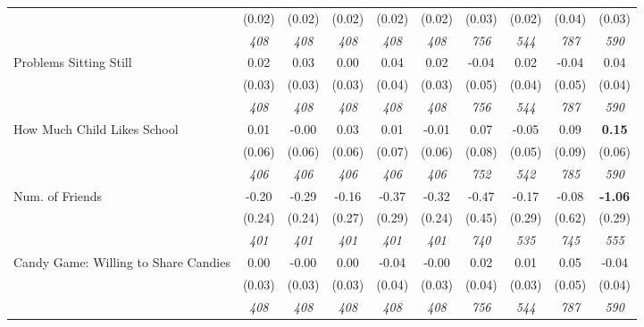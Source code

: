 \begin{tabular}{l c c c c c c c c c}
& (0.02) & (0.02) & (0.02) & (0.02) & (0.02) & (0.03) & (0.02) & (0.04) & (0.03) \\
& \textit{ 408 } & \textit{ 408 } & \textit{ 408 } & \textit{ 408 } & \textit{ 408 } & \textit{ 756 } & \textit{ 544 } & \textit{ 787 } & \textit{ 590 } \\
Problems Sitting Still & 0.02 & 0.03 & 0.00 & 0.04 & 0.02 & -0.04 & 0.02 & -0.04 & 0.04 \\
& (0.03) & (0.03) & (0.03) & (0.04) & (0.03) & (0.05) & (0.04) & (0.05) & (0.04) \\
& \textit{ 408 } & \textit{ 408 } & \textit{ 408 } & \textit{ 408 } & \textit{ 408 } & \textit{ 756 } & \textit{ 544 } & \textit{ 787 } & \textit{ 590 } \\
How Much Child Likes School & 0.01 & -0.00 & 0.03 & 0.01 & -0.01 & 0.07 & -0.05 & 0.09 & \textbf{0.15} \\
& (0.06) & (0.06) & (0.06) & (0.07) & (0.06) & (0.08) & (0.05) & (0.09) & (0.06) \\
& \textit{ 406 } & \textit{ 406 } & \textit{ 406 } & \textit{ 406 } & \textit{ 406 } & \textit{ 752 } & \textit{ 542 } & \textit{ 785 } & \textit{ 590 } \\
Num. of Friends & -0.20 & -0.29 & -0.16 & -0.37 & -0.32 & -0.47 & -0.17 & -0.08 & \textbf{-1.06} \\
& (0.24) & (0.24) & (0.27) & (0.29) & (0.24) & (0.45) & (0.29) & (0.62) & (0.29) \\
& \textit{ 401 } & \textit{ 401 } & \textit{ 401 } & \textit{ 401 } & \textit{ 401 } & \textit{ 740 } & \textit{ 535 } & \textit{ 745 } & \textit{ 555 } \\
Candy Game: Willing to Share Candies & 0.00 & -0.00 & 0.00 & -0.04 & -0.00 & 0.02 & 0.01 & 0.05 & -0.04 \\
& (0.03) & (0.03) & (0.03) & (0.04) & (0.03) & (0.04) & (0.03) & (0.05) & (0.04) \\
& \textit{ 408 } & \textit{ 408 } & \textit{ 408 } & \textit{ 408 } & \textit{ 408 } & \textit{ 756 } & \textit{ 544 } & \textit{ 787 } & \textit{ 590 } \\
\bottomrule
\end{tabular}
